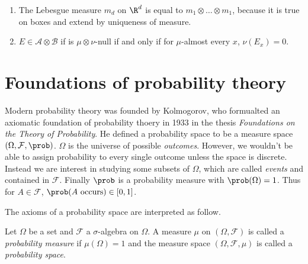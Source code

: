 \documentclass[a4paper]{article}
\renewcommand{\P}{\prob} %
\begin{document}
\begin{note}\leavevmode
  \begin{enumerate}
  \item The Lebesgue measure \(m_d\) on \(\R^d\) is equal to \(m_1 \otimes \dots \otimes m_1\), because it is true on boxes and extend by uniqueness of measure.
  \item \(E \in \mathcal A \otimes \mathcal B\) if is \(\mu \otimes \nu\)-null if and only if for \(\mu\)-almost every \(x\), \(\nu(E_x) = 0\).
  \end{enumerate}
\end{note}

\section{Foundations of probability theory}

Modern probability theory was founded by Kolmogorov, who formualted an axiomatic foundation of probability thoery in 1933 in the thesis \emph{Foundations on the Theory of Probability}. He defined a probability space to be a measure space \((\Omega, \mathcal F, \P)\). \(\Omega\) is the universe of possible \emph{outcomes}. However, we wouldn't be able to assign probability to every single outcome unless the space is discrete. Instead we are interest in studying some subsets of \(\Omega\), which are called \emph{events} and contained in \(\mathcal F\). Finally \(\P\) is a probability measure with \(\P(\Omega) = 1\). Thus for \(A \in \mathcal F\), \(\P(A \text{ occurs}) \in [0, 1]\).

The axioms of a probability space are interpreted as follow.


\begin{definition}
  Let \(\Omega\) be a set and \(\mathcal F\) a \(\sigma\)-algebra on \(\Omega\). A measure \(\mu\) on \((\Omega, \mathcal F)\) is called a \emph{probability measure} if \(\mu(\Omega) = 1\) and the measure space \((\Omega, \mathcal F, \mu)\) is called a \emph{probability space}.
\end{definition}
\end{document}
